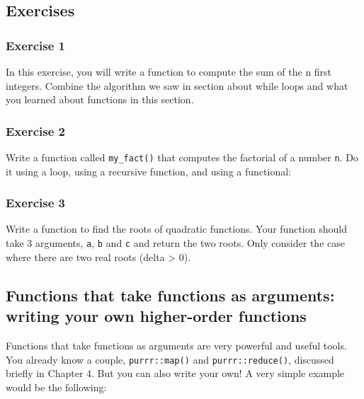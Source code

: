 \documentclass[]{gitbook}
\begin{document}
\hypertarget{exercises-4}{%
\subsection{Exercises}\label{exercises-4}}

\hypertarget{exercise-1-4}{%
\subsubsection*{Exercise 1}\label{exercise-1-4}}

In this exercise, you will write a function to compute the sum of the n first integers. Combine the
algorithm we saw in section about while loops and what you learned about functions
in this section.

\hypertarget{exercise-2-2}{%
\subsubsection*{Exercise 2}\label{exercise-2-2}}

Write a function called \texttt{my\_fact()} that computes the factorial of a number \texttt{n}. Do it using a
loop, using a recursive function, and using a functional:

\hypertarget{exercise-3-2}{%
\subsubsection*{Exercise 3}\label{exercise-3-2}}

Write a function to find the roots of quadratic functions. Your function should take 3 arguments,
\texttt{a}, \texttt{b} and \texttt{c} and return the two roots. Only consider the case where there are two real roots
(delta \textgreater{} 0).

\hypertarget{functions-that-take-functions-as-arguments-writing-your-own-higher-order-functions}{%
\subsection{Functions that take functions as arguments: writing your own higher-order functions}\label{functions-that-take-functions-as-arguments-writing-your-own-higher-order-functions}}

Functions that take functions as arguments are very powerful and useful tools. You already know a
couple, \texttt{purrr::map()} and \texttt{purrr::reduce()}, discussed briefly in Chapter 4.
But you can also write your own! A very simple example would be the following:
\end{document}
